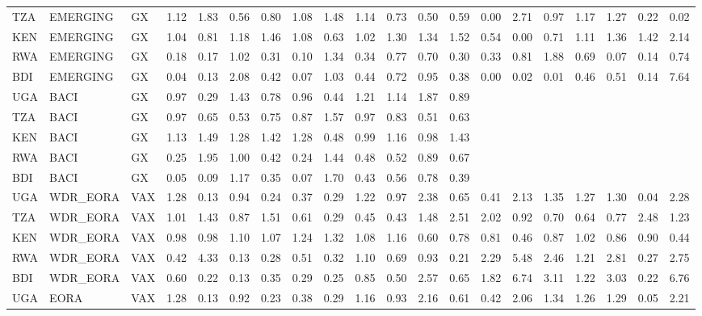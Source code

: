 \documentclass[a4paper]{article}
\begin{document}
\begin{table}[ht]
{\begin{tabular}{lllrrrrrrrrrrrrrrrrr}
  TZA & EMERGING & GX & 1.12 & 1.83 & 0.56 & 0.80 & 1.08 & 1.48 & 1.14 & 0.73 & 0.50 & 0.59 & 0.00 & 2.71 & 0.97 & 1.17 & 1.27 & 0.22 & 0.02 \\ 
  KEN & EMERGING & GX & 1.04 & 0.81 & 1.18 & 1.46 & 1.08 & 0.63 & 1.02 & 1.30 & 1.34 & 1.52 & 0.54 & 0.00 & 0.71 & 1.11 & 1.36 & 1.42 & 2.14 \\ 
  RWA & EMERGING & GX & 0.18 & 0.17 & 1.02 & 0.31 & 0.10 & 1.34 & 0.34 & 0.77 & 0.70 & 0.30 & 0.33 & 0.81 & 1.88 & 0.69 & 0.07 & 0.14 & 0.74 \\ 
  BDI & EMERGING & GX & 0.04 & 0.13 & 2.08 & 0.42 & 0.07 & 1.03 & 0.44 & 0.72 & 0.95 & 0.38 & 0.00 & 0.02 & 0.01 & 0.46 & 0.51 & 0.14 & 7.64 \\ \midrule
  UGA & BACI & GX & 0.97 & 0.29 & 1.43 & 0.78 & 0.96 & 0.44 & 1.21 & 1.14 & 1.87 & 0.89 &  &  &  &  &  &  &  \\ 
  TZA & BACI & GX & 0.97 & 0.65 & 0.53 & 0.75 & 0.87 & 1.57 & 0.97 & 0.83 & 0.51 & 0.63 &  &  &  &  &  &  &  \\ 
  KEN & BACI & GX & 1.13 & 1.49 & 1.28 & 1.42 & 1.28 & 0.48 & 0.99 & 1.16 & 0.98 & 1.43 &  &  &  &  &  &  &  \\ 
  RWA & BACI & GX & 0.25 & 1.95 & 1.00 & 0.42 & 0.24 & 1.44 & 0.48 & 0.52 & 0.89 & 0.67 &  &  &  &  &  &  &  \\ 
  BDI & BACI & GX & 0.05 & 0.09 & 1.17 & 0.35 & 0.07 & 1.70 & 0.43 & 0.56 & 0.78 & 0.39 &  &  &  &  &  &  &  \\ \midrule
  UGA & WDR\_EORA & VAX & 1.28 & 0.13 & 0.94 & 0.24 & 0.37 & 0.29 & 1.22 & 0.97 & 2.38 & 0.65 & 0.41 & 2.13 & 1.35 & 1.27 & 1.30 & 0.04 & 2.28 \\ 
  TZA & WDR\_EORA & VAX & 1.01 & 1.43 & 0.87 & 1.51 & 0.61 & 0.29 & 0.45 & 0.43 & 1.48 & 2.51 & 2.02 & 0.92 & 0.70 & 0.64 & 0.77 & 2.48 & 1.23 \\ 
  KEN & WDR\_EORA & VAX & 0.98 & 0.98 & 1.10 & 1.07 & 1.24 & 1.32 & 1.08 & 1.16 & 0.60 & 0.78 & 0.81 & 0.46 & 0.87 & 1.02 & 0.86 & 0.90 & 0.44 \\ 
  RWA & WDR\_EORA & VAX & 0.42 & 4.33 & 0.13 & 0.28 & 0.51 & 0.32 & 1.10 & 0.69 & 0.93 & 0.21 & 2.29 & 5.48 & 2.46 & 1.21 & 2.81 & 0.27 & 2.75 \\ 
  BDI & WDR\_EORA & VAX & 0.60 & 0.22 & 0.13 & 0.35 & 0.29 & 0.25 & 0.85 & 0.50 & 2.57 & 0.65 & 1.82 & 6.74 & 3.11 & 1.22 & 3.03 & 0.22 & 6.76 \\ \midrule
  UGA & EORA & VAX & 1.28 & 0.13 & 0.92 & 0.23 & 0.38 & 0.29 & 1.16 & 0.93 & 2.16 & 0.61 & 0.42 & 2.06 & 1.34 & 1.26 & 1.29 & 0.05 & 2.21 \\ 

\end{tabular}}
\end{table}
\end{document}
